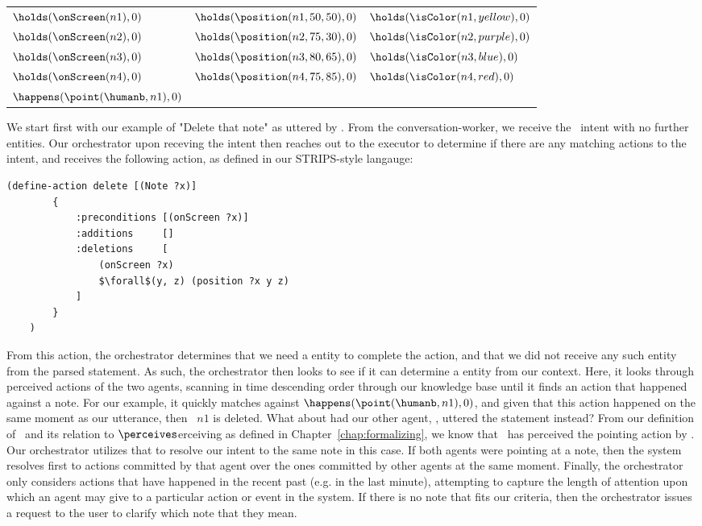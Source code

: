 \begin{center}
\begin{tabular}{ l l l }
    $\holds(\onScreen(n1), 0)$ & 
    $\holds(\position(n1, 50, 50), 0)$ &
    $\holds(\isColor(n1, yellow), 0)$ \\
    $\holds(\onScreen(n2), 0)$ &
    $\holds(\position(n2, 75, 30), 0)$ &
    $\holds(\isColor(n2, purple), 0)$ \\
    $\holds(\onScreen(n3), 0)$ &
    $\holds(\position(n3, 80, 65), 0)$ &
    $\holds(\isColor(n3, blue), 0)$ \\
    $\holds(\onScreen(n4), 0)$ &
    $\holds(\position(n4, 75, 85), 0)$ &
    $\holds(\isColor(n4, red), 0)$ \\
    $\happens(\point(\humanb, n1), 0)$
\end{tabular}
\end{center}

We start first with our example of "Delete that note" as uttered by \humanb. From the conversation-worker,
we receive the \delete\ intent with no further entities. Our orchestrator upon receving the intent then
reaches out to the executor to determine if there are any matching actions to the intent, and receives
the following action, as defined in our STRIPS-style langauge:


\begin{lstlisting}[caption=delete,mathescape=true]
    (define-action delete [(Note ?x)]
        {
            :preconditions [(onScreen ?x)]
            :additions     []
            :deletions     [
                (onScreen ?x)
                $\forall$(y, z) (position ?x y z)
            ]
        }
    )
\end{lstlisting}

From this action, the orchestrator determines that we need a \Note entity to complete the
action, and that we did not receive any such entity from the parsed statement. As such,
the orchestrator then looks to see if it can determine a \Note entity from our context. Here,
it looks through perceived actions of the two agents, scanning in time descending order through
our knowledge base until it finds an action that happened against a note. For our example, it
quickly matches against $\happens(\point(\humanb, n1), 0)$, and given that this action happened
on the same moment as our utterance, then \Note\ $n1$ is deleted. What about had our other agent,
\humana, uttered the statement instead? From our definition of \vicinity\ and its relation to $\perceives$erceiving
as defined in Chapter~\ref{chap:formalizing}, we know that \humana\ has perceived the pointing action
by \humanb. Our orchestrator utilizes that to resolve our intent to the same note in this case.
If both agents were pointing at a note, then the system resolves first to actions committed by that
agent over the ones committed by other agents at the same moment. Finally, the orchestrator
only considers actions that have happened in the recent past (e.g. in the last minute), attempting
to capture the length of attention upon which an agent may give to a particular action or event in
the system. If there is no note that fits our criteria, then the orchestrator issues a request
to the user to clarify which note that they mean.

